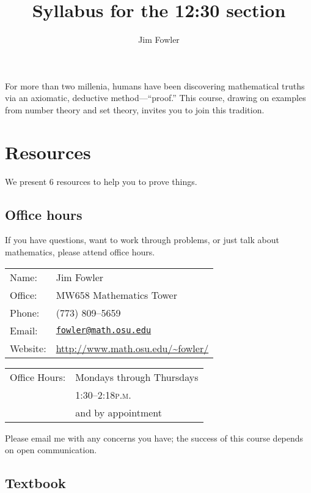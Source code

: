 \documentclass[12pt]{handout}
\title{Syllabus for the 12:30 section}
\author{Jim Fowler}
\newcommand{\peem}{\textsc{p.m.}}
\begin{document}
\maketitle

\noindent For more than two millenia, humans have been discovering
mathematical truths via an axiomatic, deductive method---``proof.''
This course, drawing on examples from number theory and set theory,
invites you to join this tradition.



\section*{Resources}

\noindent%
We present 6 resources to help you to prove things.

\subsection*{Office hours}
If you have questions, want to work through problems, or just talk
about mathematics, please attend office hours.

\vspace{1ex}%
\noindent\parbox{0.5\textwidth}{%
\noindent\begin{tabular}{@{}ll}
\textsf{Name:} & Jim Fowler \\
\textsf{Office:} & MW658 Mathematics Tower \\
\textsf{Phone:} & (773) 809--5659 \\
\textsf{Email:} & \href{mailto:fowler@math.osu.edu}{\texttt{fowler@math.osu.edu}} \\
\textsf{Website:} & \url{http://www.math.osu.edu/~fowler/}
\end{tabular}}
\noindent\parbox{0.5\textwidth}{%
\begin{tabular}{@{}ll}
\textsf{Office Hours:}
& Mondays through Thursdays \\
& 1:30--2:18\peem \\
& and by appointment
\end{tabular}}

\vspace{1ex}\noindent
Please email me with any concerns you have; the success of this course
depends on open communication.

\subsection*{Textbook}
\end{document}
